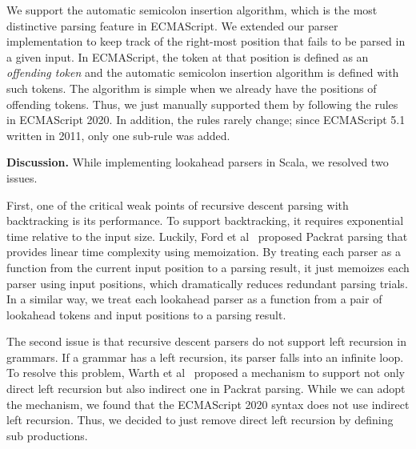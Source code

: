 We support the automatic semicolon insertion algorithm, which
is the most distinctive parsing feature in ECMAScript.  We extended
our parser implementation to keep track of the right-most position
that fails to be parsed in a given input.  In ECMAScript, the token at that
position is defined as an \textit{offending token} and the automatic
semicolon insertion algorithm is defined with such tokens.  The
algorithm is simple when we already have the positions of offending
tokens.  Thus, we just manually supported them by following the rules
in ECMAScript 2020.  In addition, the rules rarely change; since
ECMAScript 5.1 written in 2011, only one sub-rule was added.

\smallskip

\textbf{Discussion.}
While implementing lookahead parsers in Scala, we resolved two issues.

First, one of the critical weak points of recursive descent parsing
with backtracking is its performance.  To support backtracking, it
requires exponential time relative to the input size.  Luckily, Ford
et al~\cite{packrat} proposed Packrat parsing that provides linear 
time complexity using memoization.  By treating each parser as a
function from the current input position to a parsing result, it just
memoizes each parser using input positions, which dramatically reduces
redundant parsing trials.  In a similar way, we treat each lookahead
parser as a function from a pair of lookahead tokens and input
positions to a parsing result.

The second issue is that recursive descent parsers do not support left
recursion in grammars.  If a grammar has a left recursion, its parser
falls into an infinite loop.  To resolve this problem, Warth et
al~\cite{packrat-lr} proposed a mechanism to support not only direct
left recursion but also indirect one in Packrat parsing.  While we can
adopt the mechanism, we found that the ECMAScript 2020 syntax does not
use indirect left recursion.  Thus, we decided to just remove direct
left recursion by defining sub productions.
